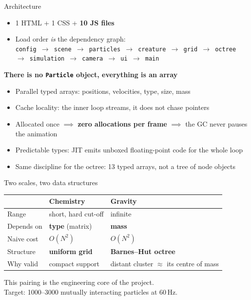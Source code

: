 \documentclass[10pt]{beamer}
\begin{document}
\begin{frame}{Architecture}
	\begin{itemize}
		\item 1 HTML + 1 CSS + \textbf{10 JS files}
		\item Load order \emph{is} the dependency graph:\\
		      {\small\texttt{config $\to$ scene $\to$ particles $\to$ creature $\to$ grid $\to$ octree $\to$
			      simulation $\to$ camera $\to$ ui $\to$ main}}
	\end{itemize}
	\vspace{1ex}
	\textbf{There is no \texttt{Particle} object, everything is an array}
	\begin{itemize}
		\item Parallel typed arrays: positions, velocities, type, size, mass
		\item Cache locality: the inner loop streams, it does not chase pointers
		\item Allocated once $\implies$ \textbf{zero allocations per frame} $\implies$ the GC never pauses the animation
		\item Predictable types: JIT emits unboxed floating-point code for the whole loop
		\item Same discipline for the octree: 13 typed arrays, not a tree of node objects
	\end{itemize}
\end{frame}

\begin{frame}{Two scales, two data structures}
	\centering
	\begin{tabular}{@{}lll@{}}
		\toprule
		           & \textbf{Chemistry}     & \textbf{Gravity}                             \\
		\midrule
		Range      & short, hard cut-off    & infinite                                     \\
		Depends on & \textbf{type} (matrix) & \textbf{mass}                                \\
		Naive cost & $O(N^2)$               & $O(N^2)$                                     \\
		Structure  & \textbf{uniform grid}  & \textbf{Barnes--Hut octree}                  \\
		Why valid  & compact support        & distant cluster $\approx$ its centre of mass \\
		\bottomrule
	\end{tabular}
	\vspace{2ex}
	\begin{block}{}
		\centering This pairing is the engineering core of the project.\\
		Target: 1000--3000 mutually interacting particles at 60\,Hz.
	\end{block}
\end{frame}
\end{document}
